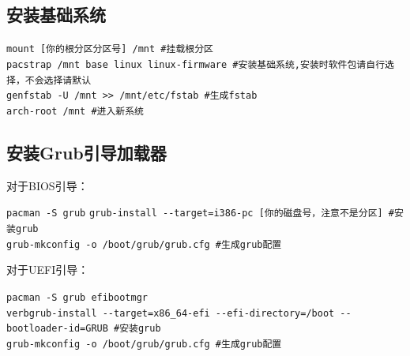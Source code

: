 \documentclass{article}
\newenvironment{singlecolumn}{%
	\par
	\noindent
	\begin{minipage}[t]{\textwidth}
		\setlength{\parfillskip}{0pt plus 1fil}
	}{%
	\end{minipage}
	\par
}
\begin{document}
\begin{singlecolumn}
	
\begin{tcolorbox}
	\section*{安装基础系统}
\end{tcolorbox}

\begin{tcolorbox}[
	title=bash,
	boxrule=1pt,
	fonttitle=\bfseries,
	listing only, 
	listing options={language=bash}
	]
	\verb|mount [你的根分区分区号] /mnt #挂载根分区|\\
	\verb|pacstrap /mnt base linux linux-firmware #安装基础系统,安装时软件包请自行选择，不会选择请默认|\\
	\verb|genfstab -U /mnt >> /mnt/etc/fstab #生成fstab|\\
	\verb|arch-root /mnt #进入新系统|\\
\end{tcolorbox}	

\medskip

\begin{tcolorbox}
	\section*{安装Grub引导加载器}
\end{tcolorbox}

\textcolor{bios}{对于BIOS引导：}\\
\begin{tcolorbox}[
	title=bash,
	boxrule=1pt,
	fonttitle=\bfseries,
	listing only, 
	listing options={language=bash}
	]
	\verb|pacman -S grub|
	\verb|grub-install --target=i386-pc [你的磁盘号，注意不是分区] #安装grub|\\
	\verb|grub-mkconfig -o /boot/grub/grub.cfg #生成grub配置|\\
\end{tcolorbox}
\textcolor{uefi}{对于UEFI引导：}\\
\begin{tcolorbox}[
	title=bash,
	boxrule=1pt,
	fonttitle=\bfseries,
	listing only, 
	listing options={language=bash}
	]
	\verb|pacman -S grub efibootmgr|\\
	\verb|verbgrub-install --target=x86_64-efi --efi-directory=/boot --bootloader-id=GRUB #安装grub|\\
	\verb|grub-mkconfig -o /boot/grub/grub.cfg #生成grub配置|\\
\end{tcolorbox}


\end{singlecolumn}
\end{document}

